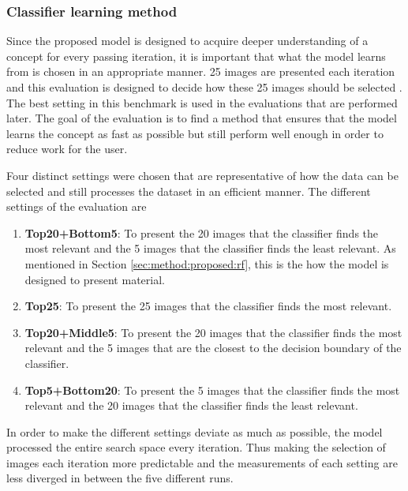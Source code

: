 \subsubsection{Classifier learning method}
\label{sec:method:eval:param:learning}
Since the proposed model is designed to acquire deeper understanding of a concept for every passing iteration, it is important that what the model learns from is chosen in an appropriate manner. 25 images are presented each iteration and this evaluation is designed to decide how these 25 images should be selected . The best setting in this benchmark is used in the evaluations that are performed later. 
The goal of the evaluation is to find a method that ensures that the model learns the concept as fast as possible but still perform well enough in order to reduce work for the user. 

Four distinct settings were chosen that are representative of how the data can be selected and still processes the dataset in an efficient manner. The different settings of the evaluation are
\begin{enumerate}
	\item \textbf{Top20+Bottom5}: To present the 20 images that the classifier finds the most relevant and the 5 images that the classifier finds the least relevant. As mentioned in Section \ref{sec:method:proposed:rf}, this is the how the model is designed to present material.  
	\item \textbf{Top25}: To present the 25 images that the classifier finds the most relevant. 
	\item \textbf{Top20+Middle5}: To present the 20 images that the classifier finds the most relevant and the 5 images that are the closest to the decision boundary of the classifier. 
	\item \textbf{Top5+Bottom20}: To present the 5 images that the classifier finds the most relevant and the 20 images that the classifier finds the least relevant. 
\end{enumerate}
In order to make the different settings deviate as much as possible, the model processed the entire search space every iteration. Thus making the selection of images each iteration more predictable and the measurements of each setting are less diverged in between the five different runs.

